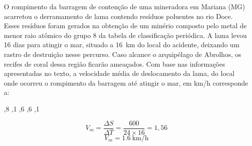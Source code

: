 \question [20] O rompimento da barragem de contenção de uma mineradora em Mariana (MG) acarretou o derramamento de lama contendo resíduos poluentes no rio Doce. Esses resíduos foram gerados na obtenção de um minério composto pelo metal de menor raio atômico do grupo 8 da tabela de classificação periódica. A lama levou 16 dias para atingir o mar, situado a \SI{16}{\kilo\meter}  do local do acidente, deixando um rastro de destruição nesse percurso. Caso alcance o arquipélago de Abrolhos, os recifes de coral dessa região ficarão ameaçados. Com base nas informações apresentadas no texto, a velocidade média de deslocamento da lama, do local onde ocorreu o rompimento da barragem até atingir o mar, em \si[per-mode=symbol]{\kilo\meter\per\hour} corresponde a:   


		\begin{EnvUplevel}
			\begin{choices}
			
			,8  
			,1    
			,6       
			,6      
			,1 
				
			\end{choices}
		\end{EnvUplevel}
		
		\begin{EnvUplevel}
		\begin{solution}
		$$
		V_m=\frac{\Delta S}{\Delta T}=\frac{600}{24\times16}=1,56
		$$$$
		V_m=\SI[per-mode=fraction]{1,6}{\kilo\meter\per\hour}
		$$
		\end{solution}
		\end{EnvUplevel}


	
